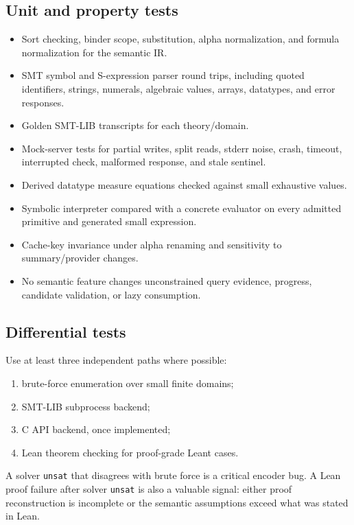 \documentclass[11pt,oneside]{article}
\newcommand{\code}[1]{\texttt{#1}}
\begin{document}
\subsection{Unit and property tests}

\begin{itemize}
  \item Sort checking, binder scope, substitution, alpha normalization, and formula
        normalization for the semantic IR.
  \item SMT symbol and S-expression parser round trips, including quoted identifiers,
        strings, numerals, algebraic values, arrays, datatypes, and error responses.
  \item Golden SMT-LIB transcripts for each theory/domain.
  \item Mock-server tests for partial writes, split reads, stderr noise, crash,
        timeout, interrupted check, malformed response, and stale sentinel.
  \item Derived datatype measure equations checked against small exhaustive values.
  \item Symbolic interpreter compared with a concrete evaluator on every admitted
        primitive and generated small expression.
  \item Cache-key invariance under alpha renaming and sensitivity to summary/provider
        changes.
  \item No semantic feature changes unconstrained query evidence, progress, candidate
        validation, or lazy consumption.
\end{itemize}

\subsection{Differential tests}

Use at least three independent paths where possible:

\begin{enumerate}
  \item brute-force enumeration over small finite domains;
  \item SMT-LIB subprocess backend;
  \item C API backend, once implemented;
  \item Lean theorem checking for proof-grade Leant cases.
\end{enumerate}

A solver \code{unsat} that disagrees with brute force is a critical encoder bug. A Lean
proof failure after solver \code{unsat} is also a valuable signal: either proof
reconstruction is incomplete or the semantic assumptions exceed what was stated in
Lean.
\end{document}

